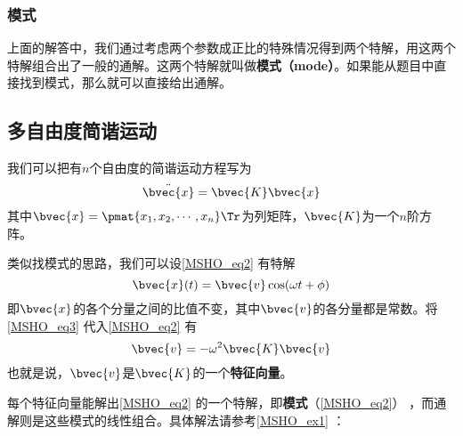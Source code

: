\subsubsection{模式}

上面的解答中，我们通过考虑两个参数成正比的特殊情况得到两个特解，用这两个特解组合出了一般的通解。这两个特解就叫做\textbf{模式（mode）}。如果能从题目中直接找到模式，那么就可以直接给出通解。




\subsection{多自由度简谐运动}

我们可以把有$n$个自由度的简谐运动方程写为
\begin{equation}\label{MSHO_eq2}
\ddot{\bvec{x}} = \bvec{K}\bvec{x}
\end{equation}
其中$\bvec{x}=\pmat{x_1, x_2, \cdots, x_n}\Tr$为列矩阵，$\bvec{K}$为一个$n$阶方阵。

类似找模式的思路，我们可以设\autoref{MSHO_eq2} 有特解
\begin{equation}\label{MSHO_eq3}
\bvec{x}(t) = \bvec{v}\cos(\omega t + \phi)
\end{equation}
即$\bvec{x}$的各个分量之间的比值不变，其中$\bvec{v}$的各分量都是常数。将\autoref{MSHO_eq3} 代入\autoref{MSHO_eq2} 有
\begin{equation}\label{MSHO_eq5}
\bvec{v} = -\omega^2\bvec{K}\bvec{v}
\end{equation}
也就是说，$\bvec{v}$是$\bvec{K}$的一个\textbf{特征向量}。

每个特征向量能解出\autoref{MSHO_eq2} 的一个特解，即\textbf{模式}（\autoref{MSHO_eq2}） ，而通解则是这些模式的线性组合。具体解法请参考\autoref{MSHO_ex1} ：






